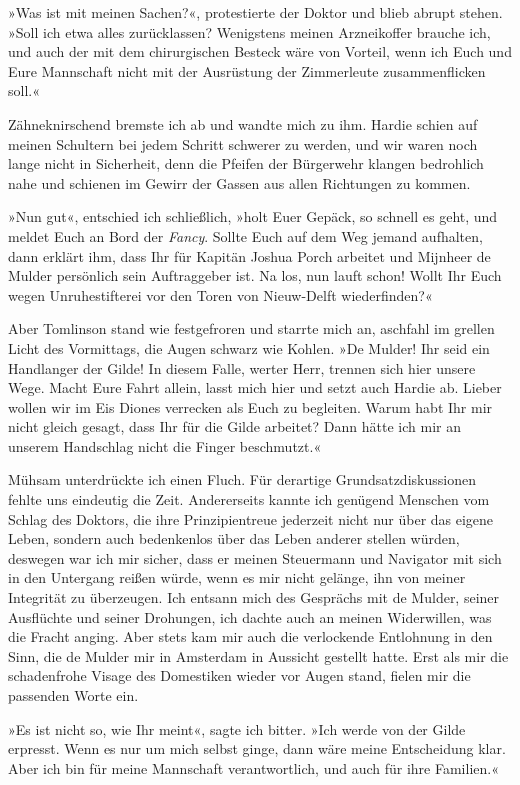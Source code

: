 »Was ist mit meinen Sachen?«, protestierte der Doktor und blieb
abrupt stehen. »Soll ich etwa alles zurücklassen? Wenigstens meinen
Arzneikoffer brauche ich, und auch der mit dem chirurgischen
Besteck wäre von Vorteil, wenn ich Euch und Eure Mannschaft nicht
mit der Ausrüstung der Zimmerleute zusammenflicken soll.«

Zähneknirschend bremste ich ab und wandte mich zu ihm. Hardie
schien auf meinen Schultern bei jedem Schritt schwerer zu werden,
und wir waren noch lange nicht in Sicherheit, denn die Pfeifen der
Bürgerwehr klangen bedrohlich nahe und schienen im Gewirr der
Gassen aus allen Richtungen zu kommen.

»Nun gut«, entschied ich schließlich, »holt Euer Gepäck, so schnell
es geht, und meldet Euch an Bord der \emph{Fancy}. Sollte Euch auf
dem Weg jemand aufhalten, dann erklärt ihm, dass Ihr für Kapitän
Joshua Porch arbeitet und Mijnheer de Mulder persönlich sein
Auftraggeber ist. Na los, nun lauft schon! Wollt Ihr Euch wegen
Unruhestifterei vor den Toren von Nieuw-Delft wiederfinden?«

Aber Tomlinson stand wie festgefroren und starrte mich an, aschfahl
im grellen Licht des Vormittags, die Augen schwarz wie Kohlen. »De
Mulder! Ihr seid ein Handlanger der Gilde! In diesem Falle, werter
Herr, trennen sich hier unsere Wege. Macht Eure Fahrt allein, lasst
mich hier und setzt auch Hardie ab. Lieber wollen wir im Eis Diones
verrecken als Euch zu begleiten. Warum habt Ihr mir nicht gleich
gesagt, dass Ihr für die Gilde arbeitet? Dann hätte ich mir an
unserem Handschlag nicht die Finger beschmutzt.«

Mühsam unterdrückte ich einen Fluch. Für derartige
Grundsatzdiskussionen fehlte uns eindeutig die Zeit. Andererseits
kannte ich genügend Menschen vom Schlag des Doktors, die ihre
Prinzipientreue jederzeit nicht nur über das eigene Leben, sondern
auch bedenkenlos über das Leben anderer stellen würden, deswegen
war ich mir sicher, dass er meinen Steuermann und Navigator mit
sich in den Untergang reißen würde, wenn es mir nicht gelänge, ihn
von meiner Integrität zu überzeugen. Ich entsann mich des Gesprächs
mit de Mulder, seiner Ausflüchte und seiner Drohungen, ich dachte
auch an meinen Widerwillen, was die Fracht anging. Aber stets kam
mir auch die verlockende Entlohnung in den Sinn, die de Mulder mir
in Amsterdam in Aussicht gestellt hatte. Erst als mir die
schadenfrohe Visage des Domestiken wieder vor Augen stand, fielen
mir die passenden Worte ein.

»Es ist nicht so, wie Ihr meint«, sagte ich bitter. »Ich werde von
der Gilde erpresst. Wenn es nur um mich selbst ginge, dann wäre
meine Entscheidung klar. Aber ich bin für meine Mannschaft
verantwortlich, und auch für ihre Familien.«

